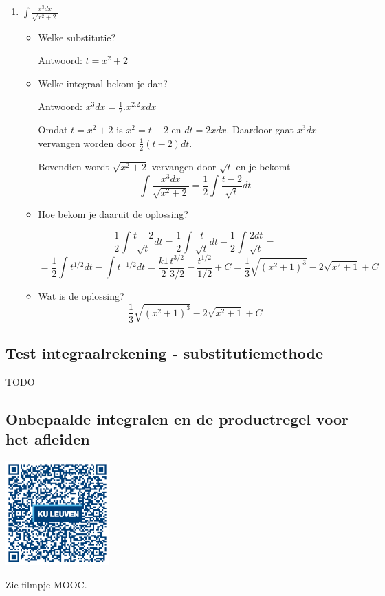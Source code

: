 \begin{enumerate}
\begin{itemize}
	\end{itemize}
	
	\item $\int \frac{x^3dx}{\sqrt{x^2+2}}$
	
	\begin{itemize}
		\item Welke substitutie?
		
		Antwoord: $t=x^2+2$
		
		\item Welke integraal bekom je dan?
		
		Antwoord: $x^3dx=\frac{1}{2}.x^2.2xdx$
		
		Omdat $t=x^2+2$ is $x^2=t-2$ en $dt=2xdx$.
		Daardoor gaat $x^3dx$ vervangen worden door $\frac{1}{2}(t-2)dt$.
		
		Bovendien wordt $\sqrt{x^2+2}$ vervangen door $\sqrt{t}$ en je bekomt
		\[
		\int \frac{x^3dx}{\sqrt{x^2+2}}=\frac{1}{2} \int \frac{t-2}{\sqrt{t}}dt
		\]
		
		\item Hoe bekom je daaruit de oplossing?
		
		\[
		\frac{1}{2} \int \frac{t-2}{\sqrt{t}}dt=\frac{1}{2} \int \frac{t}{\sqrt{t}}dt - \frac{1}{2}\int \frac{2dt}{\sqrt{t}}=
		\]
		\[
		=\frac{1}{2} \int t^{1/2}dt - \int t^{-1/2}dt=\frac{k1}{2}\frac{t^{3/2}}{3/2}-\frac{t^{1/2}}{1/2}+C=\frac{1}{3} \sqrt{(x^2+1)^3}-2\sqrt{x^2+1}+C
		\]
		
		\item Wat is de oplossing?
		\[
		\frac{1}{3} \sqrt{(x^2+1)^3}-2\sqrt{x^2+1}+C
		\]
		
	\end{itemize}
	
\end{enumerate}


\subsection{Test integraalrekening - substitutiemethode}
TODO

\subsection{Onbepaalde integralen en de productregel voor het afleiden}
\begin{minipage}{.25\linewidth}
	\raggedright
	\includegraphics[width=4cm]{6_afgeleiden_integralen/inputs/QR_Code_ONBEPPRODUCTREGEL_module6_3new}
\end{minipage}
\begin{minipage}{.7\linewidth}
	Zie filmpje MOOC.
\end{minipage}


